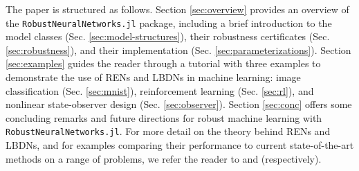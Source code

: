 The paper is structured as follows. Section \ref{sec:overview} provides an overview of the \verb|RobustNeuralNetworks.jl| package, including a brief introduction to the model classes (Sec. \ref{sec:model-structures}), their robustness certificates (Sec. \ref{sec:robustness}), and their implementation (Sec. \ref{sec:parameterizations}). Section \ref{sec:examples} guides the reader through a tutorial with three examples to demonstrate the use of RENs and LBDNs in machine learning: image classification (Sec. \ref{sec:mnist}), reinforcement learning (Sec. \ref{sec:rl}), and nonlinear state-observer design (Sec. \ref{sec:observer}). Section \ref{sec:conc} offers some concluding remarks and future directions for robust machine learning with \verb|RobustNeuralNetworks.jl|. For more detail on the theory behind RENs and LBDNs, and for examples comparing their performance to current state-of-the-art methods on a range of problems, we refer the reader to \cite{Revay++2023} and \cite{Wang+Manchester2023} (respectively).
